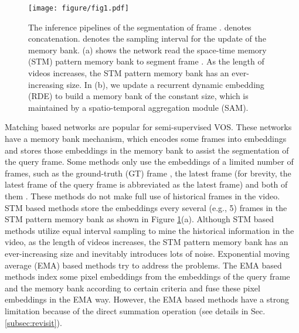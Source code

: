 \documentclass[10pt,twocolumn,letterpaper]{article}
\begin{document}
\begin{figure}[t]
\centering \texttt{[image: figure/fig1.pdf]}
\vspace{-.3em}
\caption{The inference pipelines of the segmentation of frame . \raisebox{.4pt}{\textcircled{\raisebox{-.8pt} {c}}} denotes concatenation.  denotes the sampling interval for the update of the memory bank. (a) shows the network read the space-time memory (STM) pattern memory bank to segment frame . As the length of videos increases, the STM pattern memory bank has an ever-increasing size. In (b), we update a recurrent dynamic embedding (RDE) to build a memory bank of the constant size, which is maintained by a spatio-temporal aggregation module (SAM).}
\label{fig:fig1}
\vspace{-1em}
\end{figure}


Matching based networks \cite{oh2018fast,yang2018efficient,lu2020video, oh2019video, seong2020kernelized, zhang2020transductive, cheng2021modular, hu2021learning,liang2021video,mao2021joint,seong2021hierarchical} are popular for semi-supervised VOS. These networks have a memory bank mechanism, which encodes some frames into embeddings and stores those embeddings in the memory bank to assist the segmentation of the query frame.
Some methods only use the embeddings of a limited number of frames, such as 
the ground-truth (GT) frame \cite{hu2018videomatch}, the latest frame
(for brevity, the latest frame of the query frame is abbreviated as the latest frame) \cite{perazzi2017learning} and both of them \cite{oh2018fast,yang2018efficient,lu2020video}. These methods do not make full use of historical frames in the video. STM based methods \cite{oh2019video, seong2020kernelized,zhang2020transductive,cheng2021modular,hu2021learning,liang2021video,mao2021joint,seong2021hierarchical} store the embeddings every several (e.g., 5) frames in the STM pattern memory bank as shown in Figure \ref{fig:fig1}(a). Although STM based methods utilize equal interval sampling to mine the historical information in the video, as the length of videos increases, the STM pattern memory bank has an ever-increasing size and inevitably introduces lots of noise. Exponential moving average (EMA) based methods \cite{li2020fast, liang2020video, wang2021swiftnet} try to address the problems. The EMA based methods index some pixel embeddings from the embeddings of the query frame and the memory bank according to certain criteria and fuse these pixel embeddings in the EMA way.  However, the EMA based methods have a strong limitation because of the direct summation operation (see details in Sec. \ref{subsec:revisit}). 
\end{document}

